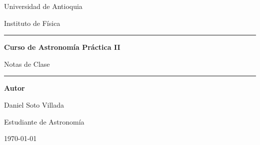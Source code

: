 \documentclass[a4paper,11pt]{report}
\begin{document}
\hypersetup{pageanchor=false}
\begin{titlepage}
    \centering

    \vspace*{2.2cm}

    {\Large Universidad de Antioquia\par}
    \vspace{0.3cm}
    {\large Instituto de Física\par}

    \vspace{2.2cm}

    \rule{\textwidth}{1.2pt}
    \vspace{0.6cm}

    {\Huge\bfseries Curso de Astronomía Práctica II\par}
    \vspace{0.5cm}
    {\LARGE Notas de Clase\par}

    \vspace{0.6cm}
    \rule{\textwidth}{1.2pt}

    \vfill

    {\large\bfseries Autor\par}
    \vspace{0.35cm}
    {\Large Daniel Soto Villada\par}
    \vspace{0.2cm}
    {\large Estudiante de Astronomía\par}

    \vfill

    {\large \today\par}

    \vspace*{1cm}
\end{titlepage}

\hypersetup{pageanchor=true}
\tableofcontents
\clearpage
{}






\end{document}
